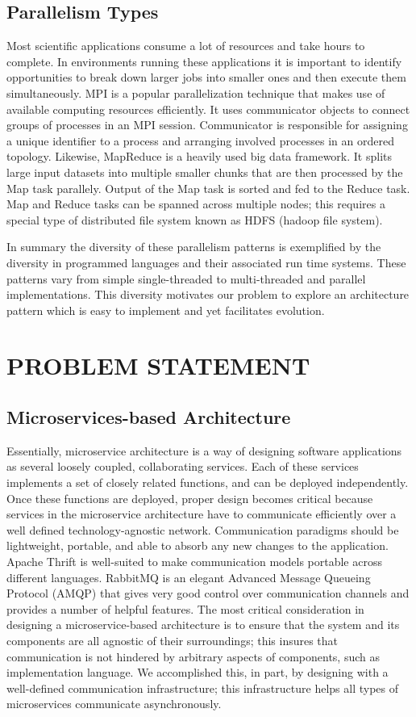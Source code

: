 \documentclass[sigconf]{acmart}
\begin{document}
\subsection{Parallelism Types}
Most scientific applications consume a lot of resources and take hours to complete. In environments running these applications it is important to identify opportunities to break down larger jobs into smaller ones and then execute them simultaneously. MPI is a popular parallelization technique that makes use of available computing resources efficiently. It uses communicator objects to connect groups of processes in an MPI session. Communicator is responsible for assigning a unique identifier to a process and arranging involved processes in an ordered topology. Likewise, MapReduce is a heavily used big data framework. It splits large input datasets into multiple smaller chunks that are then processed by the Map task parallely. Output of the Map task is sorted and fed to the Reduce task. Map and Reduce tasks can be spanned across multiple nodes; this requires a special type of distributed file system known as HDFS (hadoop file system).

In summary the diversity of these parallelism patterns is exemplified by the diversity in programmed languages and their associated run time systems. These patterns  vary from simple single-threaded to multi-threaded and parallel implementations. This diversity motivates our problem to explore an architecture pattern which is easy to implement and yet facilitates evolution.   

\section{PROBLEM STATEMENT}

\subsection{Microservices-based Architecture}
Essentially, microservice architecture is a way of designing software applications as several loosely coupled, collaborating services. Each of these services implements a set of closely related functions, and can be deployed independently. Once these functions are deployed, proper design becomes critical because services in the microservice architecture have to communicate efficiently over a well defined technology-agnostic network. Communication paradigms should be lightweight, portable, and able to absorb any new changes to the application. Apache Thrift is well-suited to make  communication models portable across different languages. RabbitMQ \cite{rabbitMQ} is an elegant Advanced Message Queueing Protocol (AMQP) that gives very good control over communication channels and provides a number of helpful features. The  most critical consideration in designing a microservice-based architecture is to ensure that the system and its components are all agnostic of their surroundings; this insures that communication is not hindered by arbitrary aspects of components, such as implementation language. We accomplished this, in part, by designing with a well-defined communication infrastructure; this infrastructure helps all types of microservices communicate asynchronously.
\end{document}
